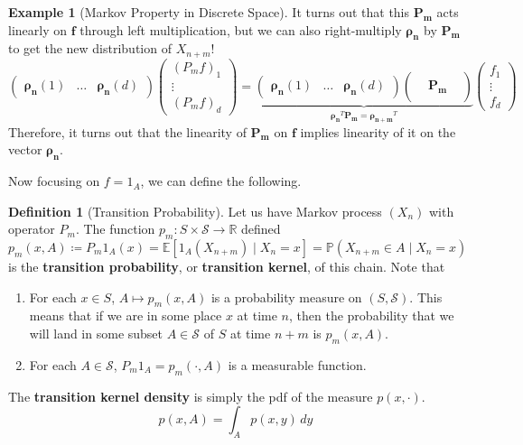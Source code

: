 \documentclass{article}
\theoremstyle{definition}
\newtheorem{example}{Example}[section]
\theoremstyle{remark}
\theoremstyle{definition}
\newtheorem{definition}{Definition}[section]
\begin{document}
\begin{example}[Markov Property in Discrete Space]
It turns out that this $\mathbf{P_m}$ acts linearly on $\mathbf{f}$ through left multiplication, but we can also right-multiply $\boldsymbol{\rho_n}$ by $\mathbf{P_m}$ to get the new distribution of $X_{n + m}$! 
\[\begin{pmatrix} \boldsymbol{\rho_n} (1) & \ldots & \boldsymbol{\rho_n} (d) \end{pmatrix} \begin{pmatrix} (P_m f)_1 \\ \vdots \\(P_m f)_d \end{pmatrix} = \underbrace{\begin{pmatrix} \boldsymbol{\rho_n} (1) & \ldots & \boldsymbol{\rho_n} (d) \end{pmatrix} \begin{pmatrix} && \\ & \mathbf{P_m} & \\ && \end{pmatrix}}_{\boldsymbol{\rho_n}^T \mathbf{P_m} = \boldsymbol{\rho_{n+m}}^T} \begin{pmatrix} f_1 \\ \vdots \\ f_d \end{pmatrix}\]
Therefore, it turns out that the linearity of $\mathbf{P_m}$ on $\mathbf{f}$ implies linearity of it on the vector $\boldsymbol{\rho_n}$. 
\end{example}

Now focusing on $f = 1_A$, we can define the following. 

\begin{definition}[Transition Probability]
Let us have Markov process $(X_n)$ with operator $P_m$. The function $p_m: S \times \mathcal{S} \rightarrow \mathbb{R}$ defined 
\[p_m(x, A) \coloneqq P_m 1_A (x) = \mathbb{E}[ 1_A (X_{n+m}) \mid X_n = x] = \mathbb{P}(X_{n + m} \in A \mid X_n = x)\]
is the \textbf{transition probability}, or \textbf{transition kernel}, of this chain. Note that 
\begin{enumerate}
    \item For each $x \in S$, $A \mapsto p_m(x, A)$ is a probability measure on $(S, \mathcal{S})$. This means that if we are in some place $x$ at time $n$, then the probability that we will land in some subset $A \in \mathcal{S}$ of $S$ at time $n+m$ is $p_m(x, A)$. 
    \item For each $A \in \mathcal{S}$, $P_m 1_A = p_m (\cdot, A)$ is a measurable function. 
\end{enumerate}
The \textbf{transition kernel density} is simply the pdf of the measure $p(x, \cdot)$. 
\[p(x, A) = \int_A p(x, y) \,dy\]
\end{definition}
\end{document}
